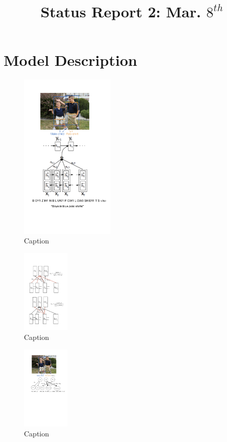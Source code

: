 \documentclass[a4paper]{article}
\title{Status Report 2: Mar. $8^{th}$}
\begin{document}
\maketitle
\section{Model Description}
\begin{figure}
    \centering
    \includegraphics[width=0.4\textwidth]{status_report2_mar8th/nmt_model.png}
    \caption{Caption}
    \label{fig:my_label}
\end{figure}
\begin{figure}
    \centering
    \includegraphics[width=0.2\textwidth]{status_report2_mar8th/norm_ov_time_vs_concept.png}
    \caption{Caption}
    \label{fig:my_label}
\end{figure}
\begin{figure}
    \centering
    \includegraphics[width=0.2\textwidth]{status_report2_mar8th/smt_model.png}
    \caption{Caption}
    \label{fig:my_label}
\end{figure}
\end{document}
